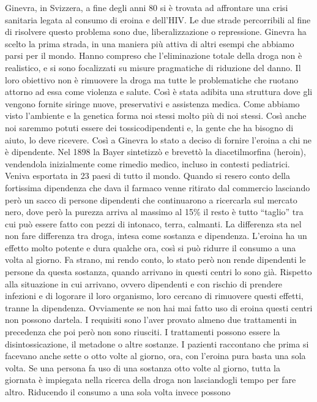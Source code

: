 \documentclass[12pt]{book} %
\begin{document}
\begin{mdframed}[linewidth=1pt]
Ginevra, in Svizzera, a fine degli anni 80 si è trovata ad affrontare una crisi sanitaria legata al consumo di eroina e dell'HIV. Le due
strade percorribili al fine di risolvere questo problema sono due, liberalizzazione o repressione. Ginevra ha scelto la
prima strada, in una maniera più attiva di altri esempi che abbiamo parsi per il mondo. Hanno compreso che l’eliminazione totale della droga non è realistico, e si sono focalizzati su misure pragmatiche di riduzione del danno. 
Il loro obiettivo non è rimuovere la droga ma tutte le problematiche che ruotano
attorno ad essa come violenza e salute. Così è stata adibita una struttura dove gli vengono fornite siringe nuove,
preservativi e assistenza medica. Come abbiamo visto l'ambiente e la genetica forma noi stessi
molto più di noi stessi. Così anche noi saremmo potuti essere dei tossicodipendenti e, la gente che ha bisogno di
aiuto, lo deve ricevere. Così a Ginevra lo stato a deciso di fornire l'eroina a chi ne è
dipendente. Nel 1898 la Bayer sintetizzò e brevettò la diacetilmorfina (heroin), vendendola inizialmente come rimedio medico, incluso in contesti pediatrici. Veniva esportata in 23 paesi di tutto il mondo. Quando si resero conto della fortissima
dipendenza che dava il farmaco venne ritirato dal commercio lasciando però un sacco di persone dipendenti che
continuarono a ricercarla sul mercato nero, dove però la purezza arriva al massimo al 15\% il resto è tutto “taglio”
tra cui può essere fatto con pezzi di intonaco, terra, calmanti. La
differenza sta nel non fare differenza tra droga, intesa come sostanza e dipendenza. L'eroina ha un effetto molto
potente e dura qualche ora, così si può ridurre il consumo a una volta al giorno. Fa strano, mi rendo conto, lo stato
però non rende dipendenti le persone da questa sostanza, quando arrivano in questi centri lo sono già. Rispetto alla
situazione in cui arrivano, ovvero dipendenti e con rischio di prendere infezioni e di logorare il loro organismo, loro
cercano di rimuovere questi effetti, tranne la dipendenza. Ovviamente se non hai mai fatto uso di eroina questi
centri non possono dartela. I requisiti sono l'aver provato almeno due trattamenti in precedenza
che poi però non sono riusciti. I trattamenti possono essere la disintossicazione, il metadone o altre sostanze. I
pazienti raccontano che prima si facevano anche sette o otto volte al giorno, ora, con l'eroina
pura basta una sola volta. Se una persona fa uso di una sostanza otto volte al giorno, tutta la giornata è impiegata
nella ricerca della droga non lasciandogli tempo per fare altro. Riducendo il consumo a una sola volta invece possono

\end{mdframed}
\end{document}
